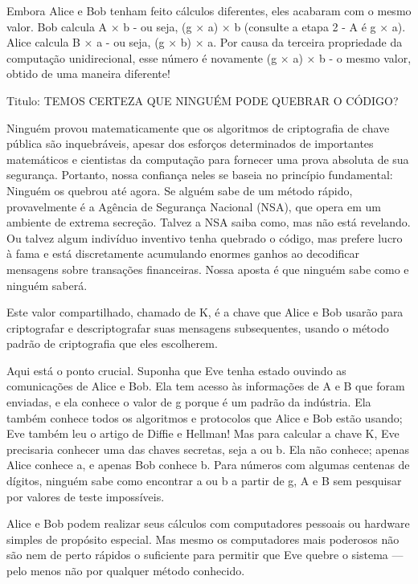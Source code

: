 \documentclass{book}
\begin{document}
Embora Alice e Bob tenham feito cálculos diferentes, eles acabaram com o mesmo valor. Bob calcula A × b - ou seja, (g × a) × b (consulte a etapa 2 - A é g × a). Alice calcula B × a - ou seja, (g × b) × a. Por causa da terceira propriedade da computação unidirecional, esse número é novamente (g × a) × b - o mesmo valor, obtido de uma maneira diferente!

Titulo: TEMOS CERTEZA QUE NINGUÉM PODE QUEBRAR O CÓDIGO?

Ninguém provou matematicamente que os algoritmos de criptografia de chave pública são inquebráveis, apesar dos esforços determinados de importantes matemáticos e cientistas da computação para fornecer uma prova absoluta de sua segurança. Portanto, nossa confiança neles se baseia no princípio fundamental: Ninguém os quebrou até agora. Se alguém sabe de um método rápido, provavelmente é a Agência de Segurança Nacional (NSA), que opera em um ambiente de extrema secreção. Talvez a NSA saiba como, mas não está revelando. Ou talvez algum indivíduo inventivo tenha quebrado o código, mas prefere lucro à fama e está discretamente acumulando enormes ganhos ao decodificar mensagens sobre transações financeiras. Nossa aposta é que ninguém sabe como e ninguém saberá.

Este valor compartilhado, chamado de K, é a chave que Alice e Bob usarão para criptografar e descriptografar suas mensagens subsequentes, usando o método padrão de criptografia que eles escolherem.

Aqui está o ponto crucial. Suponha que Eve tenha estado ouvindo as comunicações de Alice e Bob. Ela tem acesso às informações de A e B que foram enviadas, e ela conhece o valor de g porque é um padrão da indústria. Ela também conhece todos os algoritmos e protocolos que Alice e Bob estão usando; Eve também leu o artigo de Diffie e Hellman! Mas para calcular a chave K, Eve precisaria conhecer uma das chaves secretas, seja a ou b. Ela não conhece; apenas Alice conhece a, e apenas Bob conhece b. Para números com algumas centenas de dígitos, ninguém sabe como encontrar a ou b a partir de g, A e B sem pesquisar por valores de teste impossíveis.

Alice e Bob podem realizar seus cálculos com computadores pessoais ou hardware simples de propósito especial. Mas mesmo os computadores mais poderosos não são nem de perto rápidos o suficiente para permitir que Eve quebre o sistema --- pelo menos não por qualquer método conhecido.
\end{document}
